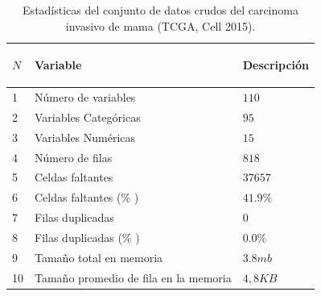 \begin{table}[!htb]
	\footnotesize
	\centering
	\begin{threeparttable}
		\begin{tabular}{p{0.5cm} p{7cm} p{2cm}} \toprule
			\begin{center}$N$\end{center}   
			&\begin{center}Variable\end{center}       
			&\begin{center}Descripción\end{center}  
			\\ \hline
			1
			& Número de variables
			& $110$
			\\ \hline
			2
			& Variables Categóricas
			& $95$
			\\ \hline
			
			3
			& Variables Numéricas
			& $15$
			\\ \hline
			
			4
			& Número de filas
			& 	$818$
			\\ \hline
			5
			& Celdas faltantes
			& $37657$
			
			\\ \hline
			6
			& Celdas faltantes (\% )
			& $41.9\%$
			
			\\ \hline
			7
			& Filas duplicadas 
			& $0$
			
			\\ \hline
			8
			& Filas duplicadas (\% )
			& $0.0\%$
			
			\\ \hline
			9
			& Tamaño total en memoria
			& $3.8 mb$
			
			\\ \hline
			10
			& Tamaño promedio de fila en la memoria
			& $	4,8 KB$
			\\ \hline	
		\end{tabular}
		\caption{Estadísticas del conjunto de datos crudos del carcinoma invasivo de mama (TCGA, Cell 2015).}
		\label{dataset_Statistics}
	\end{threeparttable}
\end{table}

